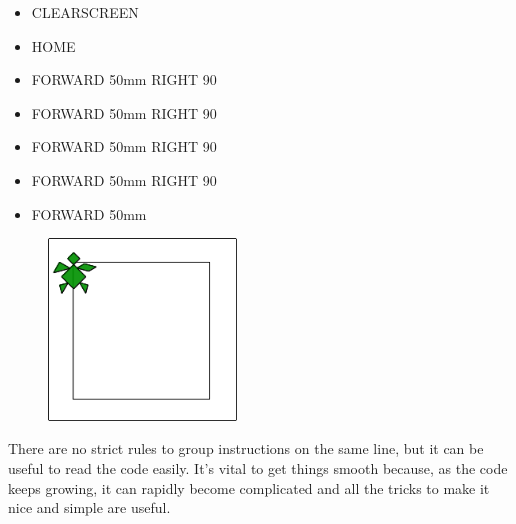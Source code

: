 \vskip 1cm

\begin{scriptsize}
\begin{minipage}{0.40\textwidth}
\begin{itemize}[itemsep=-3pt,parsep=2pt]
\item[] CLEARSCREEN             
\item[] HOME
\item[] FORWARD 50mm RIGHT 90
\item[] FORWARD 50mm RIGHT 90
\item[] FORWARD 50mm RIGHT 90
\item[] FORWARD 50mm RIGHT 90
\item[] FORWARD 50mm
\end{itemize}
\end{minipage}
\end{scriptsize}
\begin{minipage}{0.4\textwidth}
\begin{figure}[H]
   \includegraphics[width=5.0cm,trim=4 4 8 4,clip]{./images/disegnare/disegnare-5.png}
   \label{dis-5}
\end{figure}
\end{minipage} \hfill

\vskip 1cm

There are no strict rules to group instructions on the same line, but it can be useful to read the code easily.
It's vital to get things smooth because, as the code keeps growing, it can rapidly become complicated and all the tricks to make it nice and simple are useful.

\vskip 1cm

